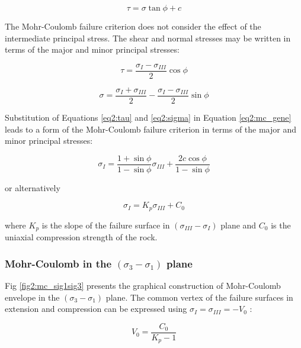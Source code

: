 \begin{equation}\label{eq2:mc_gene}
    \tau = \sigma \tan \phi + c
\end{equation}

The Mohr-Coulomb failure criterion does not consider the effect of the intermediate principal stress. The shear and normal stresses may be written in terms of the major and minor principal stresses: 

\begin{equation}\label{eq2:tau}
    \tau = \frac{\sigma_I - \sigma_{III}}{2} \cos \phi
\end{equation}

\begin{equation}\label{eq2:sigma}
    \sigma = \frac{\sigma_I + \sigma_{III}}{2} - \frac{\sigma_I - \sigma_{III}}{2} \sin \phi
\end{equation}

Substitution of Equations \ref{eq2:tau} and \ref{eq2:sigma} in Equation \ref{eq2:mc_gene} leads to a form of the Mohr-Coulomb failure criterion in terms of the major and minor principal stresses:

\begin{equation} \label{eq2:MCfinalform}
    \sigma_{I}=\frac{1+\sin \phi}{1-\sin \phi} \sigma_{I I I}+\frac{2 c \cos \phi}{1-\sin \phi}
\end{equation}

or alternatively

\begin{equation}\label{eq2:MCcondenseform}
    \sigma_I = K_p \sigma_{III} + C_0
\end{equation}

where $K_p$ is the slope of the failure surface in $(\sigma_{III} -\sigma_{I})$ plane and $C_0$ is the uniaxial compression strength of the rock. 

\subsubsection{Mohr-Coulomb in the \texorpdfstring{$(\sigma_3 -\sigma_1)$}{sigma 3 - sigma 1} plane}

Fig \ref{fig2:mc_sig1sig3} presents the graphical construction of Mohr-Coulomb envelope in the $(\sigma_3 -\sigma_1)$ plane. The common vertex of the failure surfaces in extension and compression can be expressed using $\sigma_I = \sigma_{III} = -V_0$ :

\begin{equation}\label{eq2:MC_Vo}
    V_0 = \frac{C_0}{K_p-1}
\end{equation}


